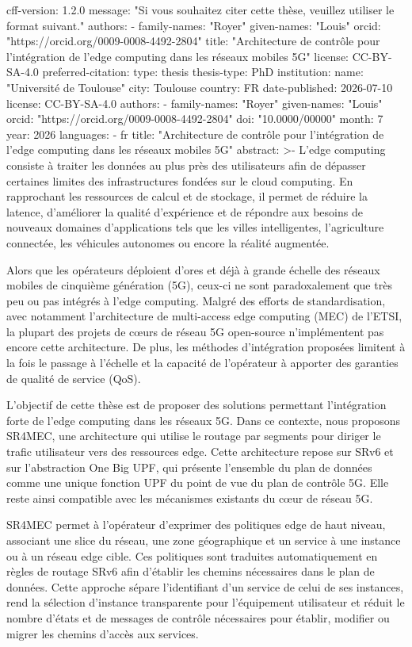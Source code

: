 cff-version: 1.2.0
message: "Si vous souhaitez citer cette thèse, veuillez utiliser le format suivant."
authors:
- family-names: "Royer"
  given-names: "Louis"
  orcid: "https://orcid.org/0009-0008-4492-2804"
title: "Architecture de contrôle pour l'intégration de l'edge computing dans les réseaux mobiles 5G"
license: CC-BY-SA-4.0
preferred-citation:
  type: thesis
  thesis-type: PhD
  institution:
    name: "Université de Toulouse"
    city: Toulouse
    country: FR
  date-published: 2026-07-10
  license: CC-BY-SA-4.0
  authors:
  - family-names: "Royer"
    given-names: "Louis"
    orcid: "https://orcid.org/0009-0008-4492-2804"
  doi: "10.0000/00000"
  month: 7
  year: 2026
  languages:
  - fr
  title: "Architecture de contrôle pour l'intégration de l'edge computing dans les réseaux mobiles 5G"
  abstract: >-
    L’edge computing consiste à traiter les données au plus près des utilisateurs afin de dépasser certaines limites des infrastructures fondées sur le cloud computing.
    En rapprochant les ressources de calcul et de stockage, il permet de réduire la latence, d’améliorer la qualité d’expérience et de répondre aux besoins de nouveaux domaines d’applications tels que les villes intelligentes, l’agriculture connectée, les véhicules autonomes ou encore la réalité augmentée.
  
    Alors que les opérateurs déploient d’ores et déjà à grande échelle des réseaux mobiles de cinquième génération (5G), ceux-ci ne sont paradoxalement que très peu ou pas intégrés à l’edge computing.
    Malgré des efforts de standardisation, avec notamment l’architecture de multi-access edge computing (MEC) de l’ETSI, la plupart des projets de cœurs de réseau 5G open-source n’implémentent pas encore cette architecture.
    De plus, les méthodes d’intégration proposées limitent à la fois le passage à l’échelle et la capacité de l’opérateur à apporter des garanties de qualité de service (QoS).
  
    L’objectif de cette thèse est de proposer des solutions permettant l’intégration forte de l’edge computing dans les réseaux 5G.
    Dans ce contexte, nous proposons SR4MEC, une architecture qui utilise le routage par segments pour diriger le trafic utilisateur vers des ressources edge.
    Cette architecture repose sur SRv6 et sur l’abstraction One Big UPF, qui présente l’ensemble du plan de données comme une unique fonction UPF du point de vue du plan de contrôle 5G.
    Elle reste ainsi compatible avec les mécanismes existants du cœur de réseau 5G.
  
    SR4MEC permet à l’opérateur d’exprimer des politiques edge de haut niveau, associant une slice du réseau, une zone géographique et un service à une instance ou à un réseau edge cible.
    Ces politiques sont traduites automatiquement en règles de routage SRv6 afin d’établir les chemins nécessaires dans le plan de données.
    Cette approche sépare l’identifiant d’un service de celui de ses instances, rend la sélection d’instance transparente pour l’équipement utilisateur et réduit le nombre d’états et de messages de contrôle nécessaires pour établir, modifier ou migrer les chemins d’accès aux services.
  
